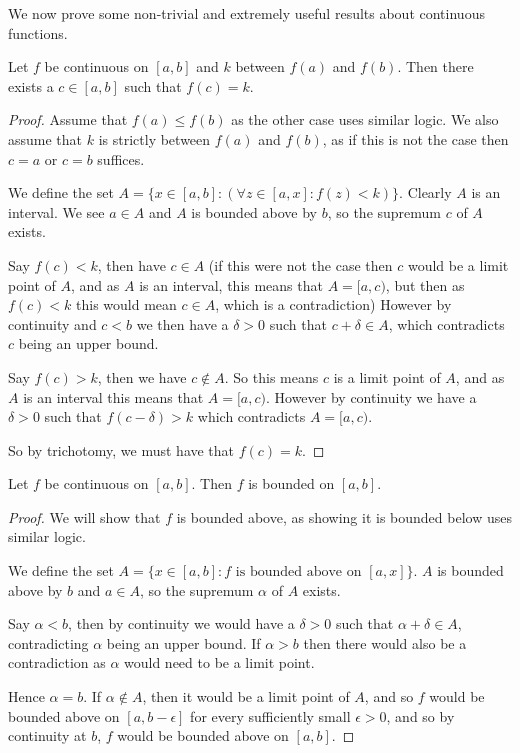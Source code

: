 \documentclass[]{article}
\begin{document}
We now prove some non-trivial and extremely useful results about continuous functions.

\begin{thm} 
		Let $f$ be continuous on $[a,b]$ and $k$ between $f(a)$ and $f(b)$. Then there exists a $c \in [a,b]$ such that $f(c) = k$.
\end{thm}

\begin{proof}
		Assume that $f(a) \leq f(b)$ as the other case uses similar logic. We also assume that $k$ is strictly between $f(a)$ and $f(b)$, as if this is not the case then $c = a$ or $c = b$ suffices.

		We define the set $A = \{x \in [a,b]: (\forall z \in [a,x]: f(z) < k)\}$. Clearly $A$ is an interval. We see $a \in A$ and $A$ is bounded above by $b$, so the supremum $c$ of $A$ exists.

		Say $f(c) < k$, then have $c \in A$ (if this were not the case then $c$ would be a limit point of $A$, and as $A$ is an interval, this means that $A = [a,c)$, but then as $f(c) < k$ this would mean $c \in A$, which is a contradiction) However by continuity and $c < b$ we then have a $\delta > 0$ such that $c + \delta \in A$, which contradicts $c$ being an upper bound.

		Say $f(c) > k$, then we have $c \notin A$. So this means $c$ is a limit point of $A$, and as $A$ is an interval this means that $A = [a,c)$. However by continuity we have a $\delta > 0$ such that $f(c-\delta) > k$ which contradicts $A = [a,c)$.

		So by trichotomy, we must have that $f(c) = k$.
\end{proof}

\begin{thm}
		Let $f$ be continuous on $[a,b]$. Then $f$ is bounded on $[a,b]$.	
\end{thm}

\begin{proof}
		We will show that $f$ is bounded above, as showing it is bounded below uses similar logic. 

		We define the set $A = \{x \in [a,b] :  \text{$f$ is bounded above on $[a,x]$}\}$. $A$ is bounded above by $b$ and $a \in A$, so the supremum $\alpha$ of  $A$ exists.

		Say $\alpha < b$, then by continuity we would have a $\delta > 0$ such that $\alpha + \delta \in A$, contradicting $\alpha$ being an upper bound. If $\alpha > b$ then there would also be a contradiction as $\alpha$ would need to be a limit point.

		Hence $\alpha = b$. If $\alpha \notin A$, then it would be a limit point of $A$, and so $f$ would be bounded above on $[a,b-\epsilon]$ for every sufficiently small $\epsilon > 0$, and so by continuity at $b$, $f$ would be bounded above on $[a,b]$.
\end{proof}
\end{document}
